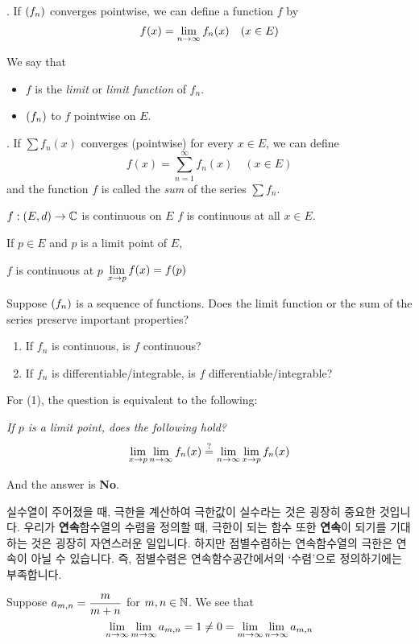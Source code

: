 . If \(\left( f_n \right)\) converges pointwise, we can define a function \(f\) by
\[
    f(x) = \lim_{n \rightarrow \infty} f_n(x) \quad (x\in E)
\]

We say that
\begin{itemize}
    \item \(f\) is the \textit{limit} or \textit{limit function} of \(f_n\).
    \item \(\left( f_n \right)\) to \(f\) pointwise on \(E\).
\end{itemize}

. If \(\sum f_n(x)\) converges (pointwise) for every \(x \in E\), we can define
\[
    f(x) = \sum_{n=1}^\infty f_n(x) \quad (x \in E)
\]
and the function \(f\) is called the \textit{sum} of the series \(\sum f_n\).

\recall \(f: (E, d) \rightarrow \mathbb{C}\) is continuous on \(E\) \miff \(f\) is continuous at all \(x \in E\).

\recall {} If \(p \in E\) and \(p\) is a limit point of \(E\),
\begin{center}
    \(f\) is continuous at \(p\) \miff \(\displaystyle \lim_{x \rightarrow p} f(x) = f(p)\)
\end{center}

\question Suppose \(\left( f_n \right)\) is a sequence of functions. Does the limit function or the sum of the series preserve important properties?
\begin{enumerate}
    \item If \(f_n\) is continuous, is \(f\) continuous?
    \item If \(f_n\) is differentiable/integrable, is \(f\) differentiable/integrable?
\end{enumerate}

For (1), the question is equivalent to the following:

\textit{If \(p\) is a limit point, does the following hold?}
\[
    \lim_{x\rightarrow p} \lim_{n\rightarrow \infty} f_n(x) \overset{?}{=} \lim_{n\rightarrow \infty} \lim_{x\rightarrow p}f_n(x)
\]

And the answer is \textbf{No}.

실수열이 주어졌을 때, 극한을 계산하여 극한값이 실수라는 것은 굉장히 중요한 것입니다. 우리가 \textbf{연속}함수열의 수렴을 정의할 때, 극한이 되는 함수 또한 \textbf{연속}이 되기를 기대하는 것은 굉장히 자연스러운 일입니다. 하지만 점별수렴하는 연속함수열의 극한은 연속이 아닐 수 있습니다. 즉, 점별수렴은 연속함수공간에서의 `수렴'으로 정의하기에는 부족합니다.

 Suppose \(\displaystyle a_{m, n} = \frac{m}{m + n}\) for \(m, n\in \mathbb{N}\). We see that
\[
    \lim_{n \rightarrow \infty} \lim_{m \rightarrow \infty} a_{m, n} = 1 \neq 0 = \lim_{m \rightarrow \infty} \lim_{n \rightarrow \infty} a_{m, n}
\]

